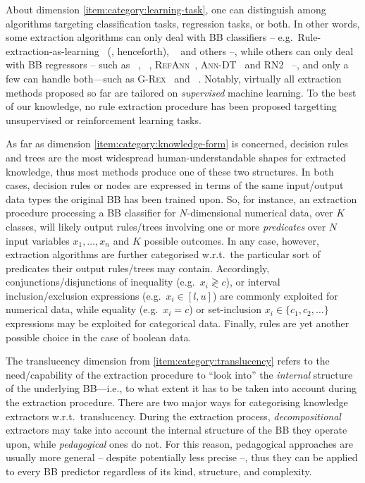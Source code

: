 \documentclass[12pt,a4paper,openright,twoside]{book}
\begin{document}
About dimension \ref{item:category:learning-task}, one can distinguish among algorithms targeting classification tasks, regression tasks, or both.
%
In other words, some extraction algorithms can only deal with BB classifiers -- e.g.\ Rule-extraction-as-learning~\cite{CravenS94} (\real, henceforth), \trepan~\cite{Craven1996} and others \cite{BarakatD2005,MartensBVGV2007} --, while others can only deal with BB regressors -- such as \iter~\cite{HuysmansBV2006}, \gridex~\cite{gridex-extraamas2021}, \textsc{RefAnn}~\cite{SetionoLZ2002}, \textsc{Ann-DT}~\cite{schmitz1999ann} and \textsc{RN2}~\cite{saito2002extracting} --, and only a few can handle both---such as \textsc{G-Rex}~\cite{grex-icdm2008} and \cart~\cite{breiman1984classification}.
%
Notably, virtually all extraction methods proposed so far are tailored on \emph{supervised} machine learning.
%
To the best of our knowledge, no rule extraction procedure has been proposed targetting unsupervised or reinforcement learning tasks.

As far as dimension \ref{item:category:knowledge-form} is concerned, decision rules \cite{freitas2014comprehensible,huysmans2011empirical,murphy1991id2} and trees \cite{quinlan1993c4,simplifyingdt-ijmms27} are the most widespread human-understandable shapes for extracted knowledge, thus most methods produce one of these two structures.
%
In both cases, decision rules or nodes are expressed in terms of the same input/output data types the original BB has been trained upon.
%
So, for instance, an extraction procedure processing a BB classifier for $N$-dimensional numerical data, over $K$ classes, will likely output rules/trees involving one or more \emph{predicates} over $N$ input variables $x_1, \ldots, x_n$ and $K$ possible outcomes.
%
In any case, however, extraction algorithms are further categorised w.r.t.\ the particular sort of predicates their output rules/trees may contain.
%
Accordingly, conjunctions/disjunctions of inequality (e.g.\ $x_i \gtrless c$), or interval inclusion/exclusion expressions (e.g.\ $x_i \in [l, u]$) are commonly exploited for numerical data, while equality (e.g.\ $x_i = c$) or set-inclusion $x_i \in \{c_1, c_2, \ldots \}$ expressions may be exploited for categorical data.
%
Finally, \mofn{} rules are yet another possible choice in the case of boolean data.

The translucency dimension \cite{AndrewsDT95} from \cref{item:category:translucency} refers to the need/capability of the extraction procedure to ``look into'' the \emph{internal} structure of the underlying BB---i.e., to what extent it has to be taken into account during the extraction procedure.
%
There are two major ways for categorising knowledge extractors w.r.t.\ translucency.
%
During the extraction process, \textit{decompositional} extractors may take into account the internal structure of the BB they operate upon, while \emph{pedagogical} ones do not.
%
For this reason, pedagogical approaches are usually more general -- despite potentially less precise --, thus they can be applied to every BB predictor regardless of its kind, structure, and complexity.
\end{document}
